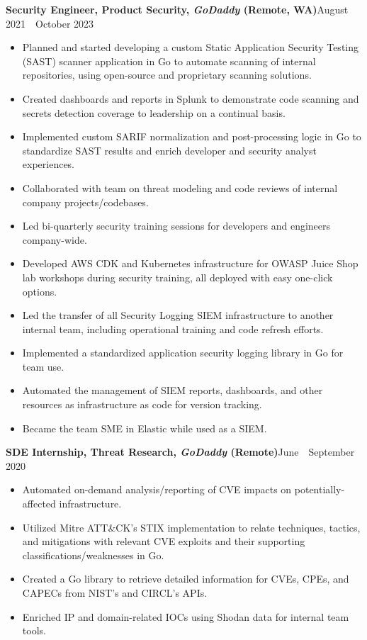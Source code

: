 \documentclass[12pt]{article}
\renewcommand\Large{\fontsize{16.5}{18}}
\newcommand{\sepspacing}{1.25em}
\newcommand{\halfsepspacing}{1em}
\newcommand{\itemspacing}{1pt}
\newcommand{\sep}{
  \vspace{\sepspacing}
}
\newcommand{\resumesection}[1]{
  \sep
  \noindent\Large{\textbf{#1}}\hfill\normalsize
}
\newcommand{\resumelistitem}[1]{
  \item{\fontsize{11.5}{18}#1}
}
\newcommand{\resumejobtitle}[5]{
  \vspace{\halfsepspacing}
  \noindent\normalsize{\textbf{#1, \textit{#2} (#3)}}\hfill\small{#4~\textemdash~#5}
}
\begin{document}
  \pagestyle{resumeheader}

  \resumesection{Work Experience}

    \resumejobtitle{Security Engineer, Product Security}{GoDaddy}{Remote, WA}{August 2021}{October 2023}

    \begin{itemize}
      \setlength{\itemsep}{\itemspacing}
      \resumelistitem{Planned and started developing a custom Static Application Security Testing (SAST)
        scanner application in Go to automate scanning of internal repositories,
        using open-source and proprietary scanning solutions.}
      \resumelistitem{Created dashboards and reports in Splunk to demonstrate code scanning and secrets detection
        coverage to leadership on a continual basis.}
      \resumelistitem{Implemented custom SARIF normalization and post-processing logic in Go
        to standardize SAST results and enrich developer and security analyst experiences.}
      \resumelistitem{Collaborated with team on threat modeling and code reviews of internal company projects/codebases.}
      \resumelistitem{Led bi-quarterly security training sessions for developers and engineers company-wide.}
      \resumelistitem{Developed AWS CDK and Kubernetes infrastructure for OWASP Juice Shop lab workshops during security training,
        all deployed with easy one-click options.}
      \resumelistitem{Led the transfer of all Security Logging SIEM infrastructure to another internal team,
        including operational training and code refresh efforts.}
      \resumelistitem{Implemented a standardized application security logging library in Go for team use.}
      \resumelistitem{Automated the management of SIEM reports, dashboards, and other resources as infrastructure as code for version tracking.}
      \resumelistitem{Became the team SME in Elastic while used as a SIEM.}
    \end{itemize}

    \resumejobtitle{SDE Internship, Threat Research}{GoDaddy}{Remote}{June}{September 2020}

    \begin{itemize}
      \setlength{\itemsep}{\itemspacing}
      \resumelistitem{Automated on-demand analysis/reporting of CVE impacts on potentially-affected infrastructure.}
      \resumelistitem{Utilized Mitre ATT\&CK's STIX implementation to relate
        techniques, tactics, and mitigations with relevant CVE
        exploits and their supporting classifications/weaknesses in Go.}
      \resumelistitem{Created a Go library to retrieve detailed information for
        CVEs, CPEs, and CAPECs from NIST's and CIRCL's APIs.}
      \resumelistitem{Enriched IP and domain-related IOCs using Shodan data for internal team tools.}
    \end{itemize}
\end{document}
